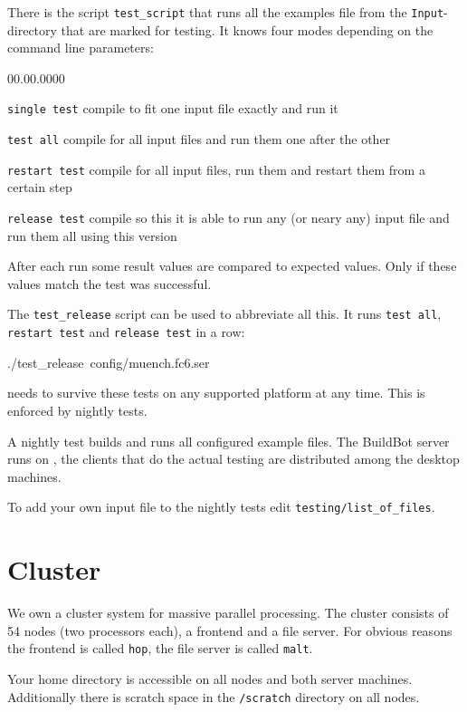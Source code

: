 There is the script \texttt{test\_script} that runs all the examples
file from the \texttt{Input}-directory that are marked for testing.
It knows four modes depending on the command line parameters:

\begin{lyxlist}{00.00.0000}
\item [{\texttt{single~test}}] compile \ccarat{} to fit one input file
exactly and run it
\item [{\texttt{test~all}}] compile \ccarat{} for all input files and
run them one after the other
\item [{\texttt{restart~test}}] compile \ccarat{} for all input files,
run them and restart them from a certain step
\item [{\texttt{release~test}}] compile \ccarat{} so this it is able
to run any (or neary any) input file and run them all using this version
\end{lyxlist}
After each run some result values are compared to expected values.
Only if these values match the test was successful.

The \texttt{test\_release} script can be used to abbreviate all this.
It runs \texttt{test all}, \texttt{restart test} and \texttt{release
test} in a row:

\begin{lyxcode}
./test\_release~config/muench.fc6.ser
\end{lyxcode}
\ccarat{} needs to survive these tests on any supported platform
at any time. This is enforced by nightly tests.

A nightly test builds and runs all configured example files. The BuildBot
server runs on \gauss{}, the clients that do the actual testing are
distributed among the desktop machines.

To add your own input file to the nightly tests edit \texttt{testing/list\_of\_files}.


\section{Cluster}

We own a cluster system for massive parallel processing. The cluster
consists of 54 nodes (two processors each), a frontend and a file
server. For obvious reasons the frontend is called \texttt{hop}, the
file server is called \texttt{malt}.

Your home directory is accessible on all nodes and both server machines.
Additionally there is scratch space in the \texttt{/scratch} directory
on all nodes.

